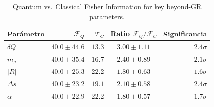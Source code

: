 \begin{table}[ht]
\centering
\caption{Quantum vs.\ Classical Fisher Information for key beyond-GR parameters.}
\begin{tabular}{lrrcr}
\toprule
Parámetro & $\mathcal{F}_Q$ & $\mathcal{F}_C$ & Ratio $\mathcal{F}_Q/\mathcal{F}_C$ & Significancia \\
\midrule
$δQ$ & $40.0\pm44.6$ & $13.3$ & $3.00\pm1.11$ & $2.4\sigma$ \\
$m_g$ & $40.0\pm35.4$ & $16.7$ & $2.40\pm0.89$ & $2.1\sigma$ \\
$|R|$ & $40.0\pm25.3$ & $22.2$ & $1.80\pm0.63$ & $1.6\sigma$ \\
$Δs$ & $40.0\pm23.2$ & $19.1$ & $2.10\pm0.58$ & $2.4\sigma$ \\
$α$ & $40.0\pm22.9$ & $22.2$ & $1.80\pm0.57$ & $1.7\sigma$ \\
\bottomrule
\end{tabular}
\end{table}